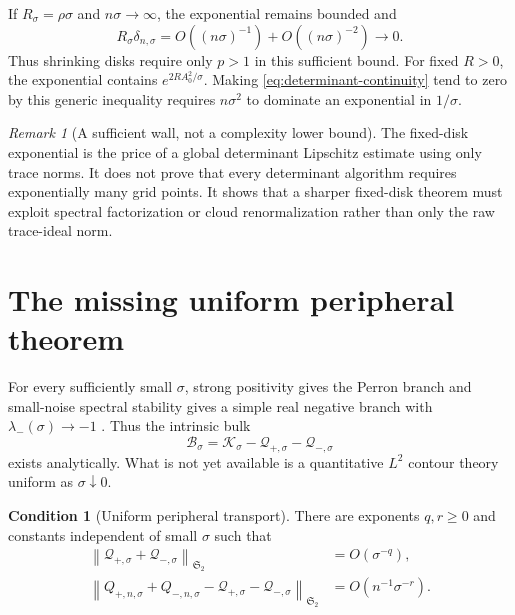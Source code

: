 \documentclass[11pt]{article}
\theoremstyle{definition}
\newtheorem{condition}[theorem]{Condition}
\theoremstyle{remark}
\newtheorem{remark}[theorem]{Remark}
\newcommand{\cK}{\mathcal K}
\newcommand{\cB}{\mathcal B}
\newcommand{\cQ}{\mathcal Q}
\newcommand{\norm}[1]{\left\lVert #1\right\rVert}
\begin{document}
If $R_\sigma=\rho\sigma$ and $n\sigma\to\infty$, the exponential remains
bounded and
\begin{equation}
 R_\sigma\delta_{n,\sigma}
 =O((n\sigma)^{-1})+O((n\sigma)^{-2})\to0.
 \label{eq:shrinking-disk}
\end{equation}
Thus shrinking disks require only $p>1$ in this sufficient bound.  For fixed
$R>0$, the exponential contains $e^{2RA_0^2/\sigma}$.  Making
\eqref{eq:determinant-continuity} tend to zero by this generic inequality
requires $n\sigma^2$ to dominate an exponential in $1/\sigma$.

\begin{remark}[A sufficient wall, not a complexity lower bound]
The fixed-disk exponential is the price of a global determinant Lipschitz
estimate using only trace norms.  It does not prove that every determinant
algorithm requires exponentially many grid points.  It shows that a sharper
fixed-disk theorem must exploit spectral factorization or cloud
renormalization rather than only the raw trace-ideal norm.
\end{remark}

\section{The missing uniform peripheral theorem}
\label{sec:peripheral}

For every sufficiently small $\sigma$, strong positivity gives the Perron
branch and small-noise spectral stability gives a simple real negative
branch with $\lambda_-(\sigma)\to-1$
\citep{WangBoundaryLayer2026}.  Thus the intrinsic bulk
\begin{equation}
 \cB_\sigma
 =\cK_\sigma-\cQ_{+,\sigma}-\cQ_{-,\sigma}
 \label{eq:small-noise-bulk}
\end{equation}
exists analytically.  What is not yet available is a quantitative
$L^2$ contour theory uniform as $\sigma\downarrow0$.

\begin{condition}[Uniform peripheral transport]
\label{cond:peripheral}
There are exponents $q,r\ge0$ and constants independent of small $\sigma$
such that
\begin{align}
 \norm{\cQ_{+,\sigma}+\cQ_{-,\sigma}}_{\mathfrak S_2}
 &=O(\sigma^{-q}),
 \label{eq:peripheral-size}\\
 \norm{Q_{+,n,\sigma}+Q_{-,n,\sigma}
       -\cQ_{+,\sigma}-\cQ_{-,\sigma}}_{\mathfrak S_2}
 &=O(n^{-1}\sigma^{-r}).
 \label{eq:peripheral-error}
\end{align}
\end{condition}
\end{document}
